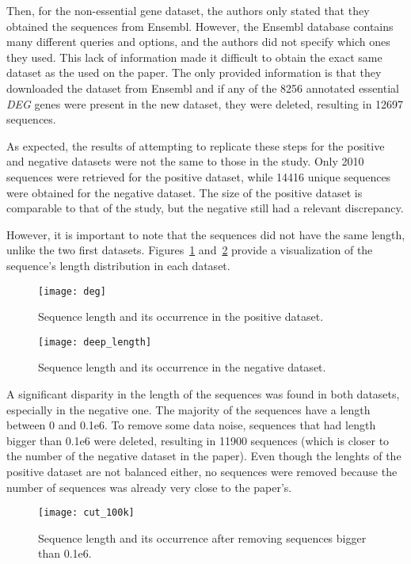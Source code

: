 Then, for the non-essential gene dataset, the authors only stated that they obtained the sequences from Ensembl. However, the Ensembl database contains many different queries and options, and the authors did not specify which ones they used. This lack of information made it difficult to obtain the exact same dataset as the used on the paper. The only provided information is that they downloaded the dataset from Ensembl and if any of the 8256 annotated essential \textit{DEG} genes were present in the new dataset, they were deleted, resulting in 12697 sequences.

As expected, the results of attempting to replicate these steps for the positive and negative datasets were not the same to those in the study. Only 2010 sequences were retrieved for the positive dataset, while 14416 unique sequences were obtained for the negative dataset. The size of the positive dataset is comparable to that of the study, but the negative still had a relevant discrepancy. 

However, it is important to note that the sequences did not have the same length, unlike the two first datasets. Figures~\ref{fig:deg_length} and~\ref{fig:deep_length}  provide a visualization of the sequence's length distribution in each dataset.

\begin{figure}[htbp]
    \centering
    \texttt{[image: deg]}
    \caption{Sequence length and its occurrence in the positive dataset.}
    \label{fig:deg_length}
\end{figure}

\begin{figure}[htbp]
    \centering
    \texttt{[image: deep\_length]}
    \caption{Sequence length and its occurrence in the negative dataset.}
    \label{fig:deep_length}
\end{figure}

A significant disparity in the length of the sequences was found in both datasets, especially in the negative one. The majority of the sequences have a length between 0 and 0.1e6. To remove some data noise, sequences that had length bigger than 0.1e6 were deleted, resulting in 11900 sequences (which is closer to the number of the negative dataset in the paper). Even though the lenghts of the positive dataset are not balanced either, no sequences were removed because the number of sequences was already very close to the paper's.

\begin{figure}[htbp]
    \centering
    \texttt{[image: cut\_100k]}
    \caption{Sequence length and its occurrence after removing sequences bigger than 0.1e6.}
    \label{fig:cut_100k}
\end{figure}

